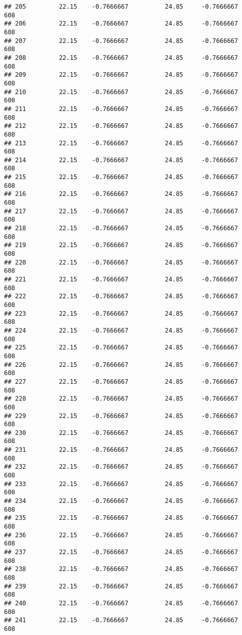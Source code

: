 \documentclass[]{article}
\begin{document}
\begin{verbatim}
## 205         22.15    -0.7666667          24.85     -0.7666667    608
## 206         22.15    -0.7666667          24.85     -0.7666667    608
## 207         22.15    -0.7666667          24.85     -0.7666667    608
## 208         22.15    -0.7666667          24.85     -0.7666667    608
## 209         22.15    -0.7666667          24.85     -0.7666667    608
## 210         22.15    -0.7666667          24.85     -0.7666667    608
## 211         22.15    -0.7666667          24.85     -0.7666667    608
## 212         22.15    -0.7666667          24.85     -0.7666667    608
## 213         22.15    -0.7666667          24.85     -0.7666667    608
## 214         22.15    -0.7666667          24.85     -0.7666667    608
## 215         22.15    -0.7666667          24.85     -0.7666667    608
## 216         22.15    -0.7666667          24.85     -0.7666667    608
## 217         22.15    -0.7666667          24.85     -0.7666667    608
## 218         22.15    -0.7666667          24.85     -0.7666667    608
## 219         22.15    -0.7666667          24.85     -0.7666667    608
## 220         22.15    -0.7666667          24.85     -0.7666667    608
## 221         22.15    -0.7666667          24.85     -0.7666667    608
## 222         22.15    -0.7666667          24.85     -0.7666667    608
## 223         22.15    -0.7666667          24.85     -0.7666667    608
## 224         22.15    -0.7666667          24.85     -0.7666667    608
## 225         22.15    -0.7666667          24.85     -0.7666667    608
## 226         22.15    -0.7666667          24.85     -0.7666667    608
## 227         22.15    -0.7666667          24.85     -0.7666667    608
## 228         22.15    -0.7666667          24.85     -0.7666667    608
## 229         22.15    -0.7666667          24.85     -0.7666667    608
## 230         22.15    -0.7666667          24.85     -0.7666667    608
## 231         22.15    -0.7666667          24.85     -0.7666667    608
## 232         22.15    -0.7666667          24.85     -0.7666667    608
## 233         22.15    -0.7666667          24.85     -0.7666667    608
## 234         22.15    -0.7666667          24.85     -0.7666667    608
## 235         22.15    -0.7666667          24.85     -0.7666667    608
## 236         22.15    -0.7666667          24.85     -0.7666667    608
## 237         22.15    -0.7666667          24.85     -0.7666667    608
## 238         22.15    -0.7666667          24.85     -0.7666667    608
## 239         22.15    -0.7666667          24.85     -0.7666667    608
## 240         22.15    -0.7666667          24.85     -0.7666667    608
## 241         22.15    -0.7666667          24.85     -0.7666667    608

\end{verbatim}
\end{document}

